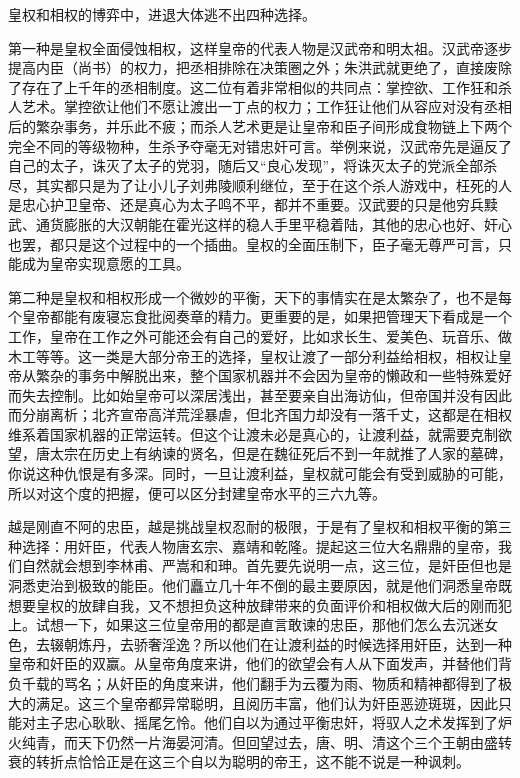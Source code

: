 \documentclass[
]{book}
\begin{document}
皇权和相权的博弈中，进退大体逃不出四种选择。

第一种是皇权全面侵蚀相权，这样皇帝的代表人物是汉武帝和明太祖。汉武帝逐步提高内臣（尚书）的权力，把丞相排除在决策圈之外；朱洪武就更绝了，直接废除了存在了上千年的丞相制度。这二位有着非常相似的共同点：掌控欲、工作狂和杀人艺术。掌控欲让他们不愿让渡出一丁点的权力；工作狂让他们从容应对没有丞相后的繁杂事务，并乐此不疲；而杀人艺术更是让皇帝和臣子间形成食物链上下两个完全不同的等级物种，生杀予夺毫无对错忠奸可言。举例来说，汉武帝先是逼反了自己的太子，诛灭了太子的党羽，随后又``良心发现''，将诛灭太子的党派全部杀尽，其实都只是为了让小儿子刘弗陵顺利继位，至于在这个杀人游戏中，枉死的人是忠心护卫皇帝、还是真心为太子鸣不平，都并不重要。汉武要的只是他穷兵黩武、通货膨胀的大汉朝能在霍光这样的稳人手里平稳着陆，其他的忠心也好、奸心也罢，都只是这个过程中的一个插曲。皇权的全面压制下，臣子毫无尊严可言，只能成为皇帝实现意愿的工具。

第二种是皇权和相权形成一个微妙的平衡，天下的事情实在是太繁杂了，也不是每个皇帝都能有废寝忘食批阅奏章的精力。更重要的是，如果把管理天下看成是一个工作，皇帝在工作之外可能还会有自己的爱好，比如求长生、爱美色、玩音乐、做木工等等。这一类是大部分帝王的选择，皇权让渡了一部分利益给相权，相权让皇帝从繁杂的事务中解脱出来，整个国家机器并不会因为皇帝的懒政和一些特殊爱好而失去控制。比如始皇帝可以深居浅出，甚至要亲自出海访仙，但帝国并没有因此而分崩离析；北齐宣帝高洋荒淫暴虐，但北齐国力却没有一落千丈，这都是在相权维系着国家机器的正常运转。但这个让渡未必是真心的，让渡利益，就需要克制欲望，唐太宗在历史上有纳谏的贤名，但是在魏征死后不到一年就推了人家的墓碑，你说这种仇恨是有多深。同时，一旦让渡利益，皇权就可能会有受到威胁的可能，所以对这个度的把握，便可以区分封建皇帝水平的三六九等。

越是刚直不阿的忠臣，越是挑战皇权忍耐的极限，于是有了皇权和相权平衡的第三种选择：用奸臣，代表人物唐玄宗、嘉靖和乾隆。提起这三位大名鼎鼎的皇帝，我们自然就会想到李林甫、严嵩和和珅。首先要先说明一点，这三位，是奸臣但也是洞悉吏治到极致的能臣。他们矗立几十年不倒的最主要原因，就是他们洞悉皇帝既想要皇权的放肆自我，又不想担负这种放肆带来的负面评价和相权做大后的刚而犯上。试想一下，如果这三位皇帝用的都是直言敢谏的忠臣，那他们怎么去沉迷女色，去辍朝炼丹，去骄奢淫逸？所以他们在让渡利益的时候选择用奸臣，达到一种皇帝和奸臣的双赢。从皇帝角度来讲，他们的欲望会有人从下面发声，并替他们背负千载的骂名；从奸臣的角度来讲，他们翻手为云覆为雨、物质和精神都得到了极大的满足。这三个皇帝都异常聪明，且阅历丰富，他们认为奸臣恶迹斑斑，因此只能对主子忠心耿耿、摇尾乞怜。他们自以为通过平衡忠奸，将驭人之术发挥到了炉火纯青，而天下仍然一片海晏河清。但回望过去，唐、明、清这个三个王朝由盛转衰的转折点恰恰正是在这三个自以为聪明的帝王，这不能不说是一种讽刺。
\end{document}
